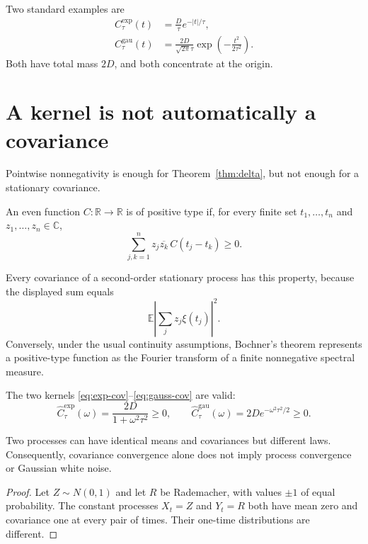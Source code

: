 \documentclass[11pt]{article}
\newcommand{\E}{\mathbb{E}}
\begin{document}
Two standard examples are
\begin{align}
C_\tau^{\mathrm{exp}}(t)
&=\frac{D}{\tau}e^{-|t|/\tau},
\label{eq:exp-cov}\\
C_\tau^{\mathrm{gau}}(t)
&=\frac{2D}{\sqrt{2\pi}\tau}
\exp\!\left(-\frac{t^2}{2\tau^2}\right).
\label{eq:gauss-cov}
\end{align}
Both have total mass \(2D\), and both concentrate at the origin.

\section{A kernel is not automatically a covariance}

Pointwise nonnegativity is enough for
Theorem~\ref{thm:delta}, but not enough for a stationary covariance.

\begin{definition}
An even function \(C:\mathbb{R}\to\mathbb{R}\) is of positive type if,
for every finite set \(t_1,\ldots,t_n\) and
\(z_1,\ldots,z_n\in\mathbb{C}\),
\[
\sum_{j,k=1}^n
z_j\overline{z_k}\,C(t_j-t_k)\geq0.
\]
\end{definition}

Every covariance of a second-order stationary process has this property,
because the displayed sum equals
\[
\E\left|
\sum_j z_j\xi(t_j)
\right|^2.
\]
Conversely, under the usual continuity assumptions, Bochner's theorem
represents a positive-type function as the Fourier transform of a finite
nonnegative spectral measure.

The two kernels \eqref{eq:exp-cov}--\eqref{eq:gauss-cov} are valid:
\[
\widehat C_\tau^{\mathrm{exp}}(\omega)
=\frac{2D}{1+\omega^2\tau^2}\geq0,
\qquad
\widehat C_\tau^{\mathrm{gau}}(\omega)
=2D e^{-\omega^2\tau^2/2}\geq0.
\]

\begin{proposition}
\label{prop:covariance}
Two processes can have identical means and covariances but different laws.
Consequently, covariance convergence alone does not imply process convergence
or Gaussian white noise.
\end{proposition}

\begin{proof}
Let \(Z\sim N(0,1)\) and let \(R\) be Rademacher, with values
\(\pm1\) of equal probability. The constant processes
\(X_t=Z\) and \(Y_t=R\) both have mean zero and covariance one at every
pair of times. Their one-time distributions are different.
\end{proof}
\end{document}
